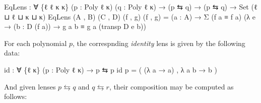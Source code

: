 \documentclass[
  11pt,
  oneside,
  article]{memoir}
\newenvironment{Shaded}{}{}
\newcommand{\DataTypeTok}[1]{\textcolor[rgb]{0.56,0.13,0.00}{#1}}
\newcommand{\NormalTok}[1]{#1}
\newcommand{\OtherTok}[1]{\textcolor[rgb]{0.00,0.44,0.13}{#1}}
\theoremstyle{definition}
\theoremstyle{plain}
\newcommand{\0}{\textsf{0}}
\newcommand{\1}{\tn{\textsf{1}}}
\begin{document}
\begin{Shaded}
\begin{Highlighting}[]
\NormalTok{EqLens }\OtherTok{:} \OtherTok{∀} \OtherTok{\{}\NormalTok{ℓ ℓ\textquotesingle{} κ κ\textquotesingle{}}\OtherTok{\}} \OtherTok{(}\NormalTok{p }\OtherTok{:}\NormalTok{ Poly ℓ κ}\OtherTok{)} \OtherTok{(}\NormalTok{q }\OtherTok{:}\NormalTok{ Poly ℓ\textquotesingle{} κ\textquotesingle{}}\OtherTok{)}
         \OtherTok{→} \OtherTok{(}\NormalTok{p ⇆ q}\OtherTok{)} \OtherTok{→} \OtherTok{(}\NormalTok{p ⇆ q}\OtherTok{)} \OtherTok{→} \DataTypeTok{Set} \OtherTok{(}\NormalTok{ℓ ⊔ ℓ\textquotesingle{} ⊔ κ ⊔ κ\textquotesingle{}}\OtherTok{)}
\NormalTok{EqLens }\OtherTok{(}\NormalTok{A , B}\OtherTok{)} \OtherTok{(}\NormalTok{C , D}\OtherTok{)} \OtherTok{(}\NormalTok{f , g}\OtherTok{)} \OtherTok{(}\NormalTok{f\textquotesingle{} , g\textquotesingle{}}\OtherTok{)} \OtherTok{=} 
  \OtherTok{(}\NormalTok{a }\OtherTok{:}\NormalTok{ A}\OtherTok{)} \OtherTok{→}\NormalTok{ Σ }\OtherTok{(}\NormalTok{f a ≡ f\textquotesingle{} a}\OtherTok{)} 
              \OtherTok{(λ}\NormalTok{ e }\OtherTok{→} \OtherTok{(}\NormalTok{b }\OtherTok{:}\NormalTok{ D }\OtherTok{(}\NormalTok{f a}\OtherTok{))} \OtherTok{→}\NormalTok{ g a b ≡ g\textquotesingle{} a }\OtherTok{(}\NormalTok{transp D e b}\OtherTok{))}
\end{Highlighting}
\end{Shaded}

For each polynomial \(p\), the correspnding \emph{identity} lens is
given by the following data:

\begin{Shaded}
\begin{Highlighting}[]
\NormalTok{id }\OtherTok{:} \OtherTok{∀} \OtherTok{\{}\NormalTok{ℓ κ}\OtherTok{\}} \OtherTok{(}\NormalTok{p }\OtherTok{:}\NormalTok{ Poly ℓ κ}\OtherTok{)} \OtherTok{→}\NormalTok{ p ⇆ p}
\NormalTok{id p }\OtherTok{=} \OtherTok{(} \OtherTok{(λ}\NormalTok{ a }\OtherTok{→}\NormalTok{ a}\OtherTok{)}\NormalTok{ , }\OtherTok{λ}\NormalTok{ a b }\OtherTok{→}\NormalTok{ b }\OtherTok{)}
\end{Highlighting}
\end{Shaded}

And given lenses \(p \leftrightarrows q\) and \(q \leftrightarrows r\),
their composition may be computed as follows:
\end{document}
